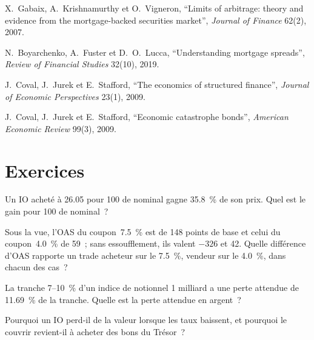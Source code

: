 \begin{omsources}
\item X.~Gabaix, A.~Krishnamurthy et O.~Vigneron, ``Limits of arbitrage: theory and evidence from the mortgage-backed securities market'',
\emph{Journal of Finance} 62(2), 2007.
\item N.~Boyarchenko, A.~Fuster et D.~O.~Lucca, ``Understanding mortgage spreads'', \emph{Review of Financial Studies} 32(10), 2019.
\item J.~Coval, J.~Jurek et E.~Stafford, ``The economics of structured finance'', \emph{Journal of Economic Perspectives} 23(1), 2009.
\item J.~Coval, J.~Jurek et E.~Stafford, ``Economic catastrophe bonds'', \emph{American Economic Review} 99(3), 2009.
\end{omsources}

\section{Exercices}

\begin{exercise}[$\star$]\label{exo:s2:mortgage-and-structured-credit-strategies:1}
Un IO acheté à 26.05 pour 100 de nominal gagne 35.8~\% de son prix. Quel est le gain pour 100 de nominal~?
\end{exercise}

\begin{exercise}[$\star$]\label{exo:s2:mortgage-and-structured-credit-strategies:2}
Sous la vue, l'OAS du coupon~7.5~\% est de 148 points de base et celui du coupon~4.0~\% de 59~; sans essoufflement, ils valent $-326$ et 42. Quelle différence d'OAS
rapporte un trade acheteur sur le 7.5~\%, vendeur sur le 4.0~\%, dans chacun des cas~?
\end{exercise}

\begin{exercise}[$\star$]\label{exo:s2:mortgage-and-structured-credit-strategies:3}
La tranche 7--10~\% d'un indice de notionnel 1 milliard a une perte attendue de 11.69~\% de la tranche. Quelle est la perte attendue en argent~?
\end{exercise}

\begin{exercise}[$\star\star$]\label{exo:s2:mortgage-and-structured-credit-strategies:4}
Pourquoi un IO perd-il de la valeur lorsque les taux baissent, et pourquoi le couvrir revient-il à acheter des bons du Trésor~?
\end{exercise}

